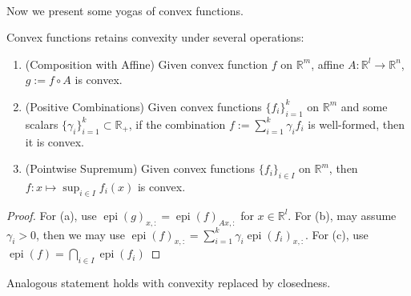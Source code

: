 \paragraph{}Now we present some yogas of convex functions.

\begin{prop}\label{prop:021-yoga-convex-functions}
	Convex functions retains convexity under several operations:
	\begin{enumerate}[label=(\alph*)]
		\item (Composition with Affine) Given convex function $f$ on $\mathbb{R}^m$, affine $A:\mathbb{R}^l\to \mathbb{R}^n$, $g:=f\circ A$ is convex.
		\item (Positive Combinations) Given convex functions $\{f_i\}_{i=1}^k$ on $\mathbb{R}^m$ and some scalars $\{\gamma_i\}_{i=1}^k\subset \mathbb{R}_{+}$, if the combination $f:=\sum_{i=1}^k \gamma_i f_i$ is well-formed, then it is convex.
		\item (Pointwise Supremum) Given convex functions $\{f_i\}_{i\in I}$ on $\mathbb{R}^m$, then $f:x\mapsto\sup_{i\in I}f_i(x)$ is convex.
	\end{enumerate}
\end{prop}

\begin{proof}
	For (a), use $\operatorname{epi}(g)_{x,:}=\operatorname{epi}(f)_{Ax,:}$ for $x\in \mathbb{R}^l$. For (b), may assume $ \gamma_i>0$, then we may use $\operatorname{epi}(f)_{x,:}=\sum_{i=1}^k\gamma_i\operatorname{epi}(f_i)_{x,:}$.	For (c), use $\operatorname{epi}(f)=\bigcap_{i\in I}\operatorname{epi}(f_i)$
\end{proof}

\begin{rmrk}
	Analogous statement holds with convexity replaced by closedness.
\end{rmrk}

